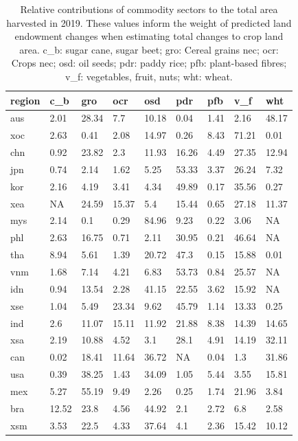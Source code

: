 \begin{table}[htb]
\centering
\caption{Relative contributions of commodity sectors to the total area harvested in 2019. These values inform the weight of predicted land endowment changes when estimating total changes to crop land area. c\_b: sugar cane, sugar beet; gro: Cereal grains nec; ocr: Crops nec; osd: oil seeds; pdr: paddy rice; pfb: plant-based fibres; v\_f: vegetables, fruit, nuts; wht: wheat.}
\label{apx:ch4:tab_faoharvested}
\begin{tabularx}{0.7\textwidth}{lllllllll}
\toprule
region & c\_b & gro & ocr & osd & pdr & pfb & v\_f & wht \\
\bottomrule
aus & 2.01 & 28.34 & 7.7 & 10.18 & 0.04 & 1.41 & 2.16 & 48.17 \\
xoc & 2.63 & 0.41 & 2.08 & 14.97 & 0.26 & 8.43 & 71.21 & 0.01 \\
chn & 0.92 & 23.82 & 2.3 & 11.93 & 16.26 & 4.49 & 27.35 & 12.94 \\
jpn & 0.74 & 2.14 & 1.62 & 5.25 & 53.33 & 3.37 & 26.24 & 7.32 \\
kor & 2.16 & 4.19 & 3.41 & 4.34 & 49.89 & 0.17 & 35.56 & 0.27 \\
xea & NA & 24.59 & 15.37 & 5.4 & 15.44 & 0.65 & 27.18 & 11.37 \\
mys & 2.14 & 0.1 & 0.29 & 84.96 & 9.23 & 0.22 & 3.06 & NA \\
phl & 2.63 & 16.75 & 0.71 & 2.11 & 30.95 & 0.21 & 46.64 & NA \\
tha & 8.94 & 5.61 & 1.39 & 20.72 & 47.3 & 0.15 & 15.88 & 0.01 \\
vnm & 1.68 & 7.14 & 4.21 & 6.83 & 53.73 & 0.84 & 25.57 & NA \\
idn & 0.94 & 13.54 & 2.28 & 41.15 & 22.55 & 3.62 & 15.92 & NA \\
xse & 1.04 & 5.49 & 23.34 & 9.62 & 45.79 & 1.14 & 13.33 & 0.25 \\
ind & 2.6 & 11.07 & 15.11 & 11.92 & 21.88 & 8.38 & 14.39 & 14.65 \\
xsa & 2.19 & 10.88 & 4.52 & 3.1 & 28.1 & 4.91 & 14.19 & 32.11 \\
can & 0.02 & 18.41 & 11.64 & 36.72 & NA & 0.04 & 1.3 & 31.86 \\
usa & 0.39 & 38.25 & 1.43 & 34.09 & 1.05 & 5.44 & 3.55 & 15.81 \\
mex & 5.27 & 55.19 & 9.49 & 2.26 & 0.25 & 1.74 & 21.96 & 3.84 \\
bra & 12.52 & 23.8 & 4.56 & 44.92 & 2.1 & 2.72 & 6.8 & 2.58 \\
xsm & 3.53 & 22.5 & 4.33 & 37.64 & 4.1 & 2.36 & 15.42 & 10.12 \\

\end{tabularx}
\end{table}
